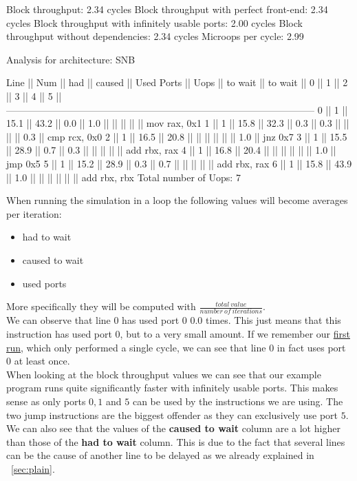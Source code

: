 \begin{example}
Block throughput: 2.34 cycles
Block throughput with perfect front-end: 2.34 cycles
Block throughput with infinitely usable ports: 2.00 cycles
Block throughput without dependencies: 2.34 cycles
Microops per cycle: 2.99

Analysis for architecture: SNB

 Line  ||   Num   ||   had   || caused  ||            Used Ports
       ||   Uops  || to wait || to wait ||   0   ||   1   ||   2   ||   3   ||   4   ||   5   ||
 ------------------------------------------------------------------------------------------------
   0   ||    1    ||  15.1   ||  43.2   ||  0.0  ||  1.0  ||       ||       ||       ||       || mov rax, 0x1
   1   ||    1    ||  15.8   ||  32.3   ||  0.3  ||  0.3  ||       ||       ||       ||  0.3  || cmp rcx, 0x0
   2   ||    1    ||  16.5   ||  20.8   ||       ||       ||       ||       ||       ||  1.0  || jnz 0x7
   3   ||    1    ||  15.5   ||  28.9   ||  0.7  ||  0.3  ||       ||       ||       ||       || add rbx, rax
   4   ||    1    ||  16.8   ||  20.4   ||       ||       ||       ||       ||       ||  1.0  || jmp 0x5
   5   ||    1    ||  15.2   ||  28.9   ||  0.3  ||  0.7  ||       ||       ||       ||       || add rbx, rax
   6   ||    1    ||  15.8   ||  43.9   ||  1.0  ||       ||       ||       ||       ||       || add rbx, rbx
Total number of Uops: 7
\end{example}

When running the simulation in a loop the following values will become averages per iteration:

\begin{itemize}
    \item had to wait
    \item caused to wait
    \item used ports
\end{itemize} 

More specifically they will be computed with $\frac{total\ value}{number\ of\ iterations}$.\\
We can observe that line $0$ has used port $0$ $0.0$ times. This just means that this instruction has used port $0$, but to a very small amount. If we remember our \hyperref[sec:plain]{first run}, which only performed a single cycle, we can see that line $0$ in fact uses port $0$ at least once.\\
When looking at the block throughput values we can see that our example program runs quite significantly faster with infinitely usable ports. This makes sense as only ports $0, 1$ and $5$ can be used by the instructions we are using. The two jump instructions are the biggest offender as they can exclusively use port $5$.\\
We can also see that the values of the \textbf{caused to wait} column are a lot higher than those of the \textbf{had to wait} column. This is due to the fact that several lines can be the cause of another line to be delayed as we already explained in ~\autoref{sec:plain}.

